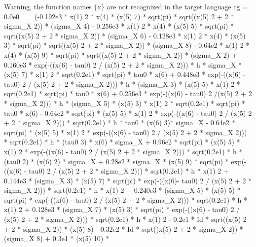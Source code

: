 \begin{maplegroup}
\begin{mapleinput}
\end{mapleinput}
\mapleresult
\underline{}Warning, the function names \{x\} are not recognized in the target language\underline{}\mapleresult
cg = 0.0e0 == (-0.192e3 * x(1)  2 * x(4) * (x(5)  7) * sqrt(pi) * sqrt((x(5)  2 + 2 * sigma\_X  2)) * (sigma\_X  4) - 0.256e3 * x(1)  2 * x(4) * (x(5)  5) * sqrt(pi) * sqrt((x(5)  2 + 2 * sigma\_X  2)) * (sigma\_X  6) - 0.128e3 * x(1)  2 * x(4) * (x(5)  3) * sqrt(pi) * sqrt((x(5)  2 + 2 * sigma\_X  2)) * (sigma\_X  8) - 0.64e2 * x(1)  2 * x(4) * (x(5)  9) * sqrt(pi) * sqrt((x(5)  2 + 2 * sigma\_X  2)) * (sigma\_X  2) + 0.160e3 * exp(-((x(6) - tau0)  2 / (x(5)  2 + 2 * sigma\_X  2))) * h * sigma\_X * (x(5)  7) * x(1)  2 * sqrt(0.2e1) * sqrt(pi) * tau0 * x(6) + 0.448e3 * exp(-((x(6) - tau0)  2 / (x(5)  2 + 2 * sigma\_X  2))) * h * (sigma\_X  3) * (x(5)  5) * x(1)  2 * sqrt(0.2e1) * sqrt(pi) * tau0 * x(6) + 0.256e3 * exp(-((x(6) - tau0)  2 /(x(5)  2 + 2 * sigma\_X  2))) * h * (sigma\_X  5) * (x(5)  3) * x(1)  2 * sqrt(0.2e1) * sqrt(pi) * tau0 * x(6) - 0.64e2 * sqrt(pi) * (x(5)  5) * x(1)  2 * exp(-((x(6) - tau0)  2 / (x(5)  2 + 2 * sigma\_X  2))) * sqrt(0.2e1) * h * tau0 * (x(6)  3)* sigma\_X - 0.64e2 * sqrt(pi) * (x(5)  5) * x(1)  2 * exp(-((x(6) - tau0)  2 / (x(5)  2 + 2 * sigma\_X  2))) * sqrt(0.2e1) * h * (tau0  3) * x(6) * sigma\_X + 0.96e2 * sqrt(pi) * (x(5)  5) * x(1)  2 * exp(-((x(6) - tau0)  2 / (x(5)  2 + 2 * sigma\_X 2))) * sqrt(0.2e1) * h * (tau0  2) * (x(6)  2) * sigma\_X + 0.28e2 * sigma\_X * (x(5)  9) * sqrt(pi) * exp(-((x(6) - tau0)  2 / (x(5)  2 + 2 * sigma\_X  2))) * sqrt(0.2e1) * h * x(1)  2 + 0.144e3 * (sigma\_X  3) * (x(5)  7) * sqrt(pi) * exp(-((x(6)- tau0)  2 / (x(5)  2 + 2 * sigma\_X  2))) * sqrt(0.2e1) * h * x(1)  2 + 0.240e3 * (sigma\_X  5) * (x(5)  5) * sqrt(pi) * exp(-((x(6) - tau0)  2 / (x(5)  2 + 2 * sigma\_X  2))) * sqrt(0.2e1) * h * x(1)  2 + 0.128e3 * (sigma\_X  7) * (x(5)  3) * sqrt(pi) * exp(-((x(6) - tau0)  2 / (x(5)  2 + 2 * sigma\_X  2))) * sqrt(0.2e1) * h * x(1)  2 - 0.2e1 * Id * sqrt((x(5)  2 + 2 * sigma\_X  2)) * (x(5)  8) - 0.32e2 * Id * sqrt((x(5)  2 + 2 * sigma\_X  2)) * (sigma\_X  8) + 0.3e1 * (x(5)  10) * 
\end{maplegroup}
